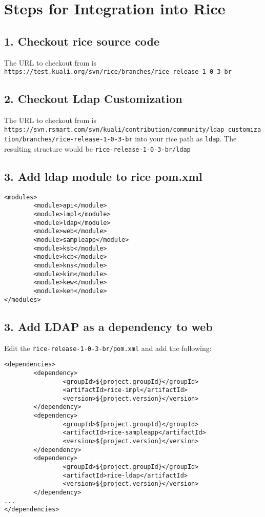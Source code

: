 \documentclass[12pt,notitlepage]{article}
\begin{document}
\section{Steps for Integration into Rice}
\subsection*{1. Checkout rice source code}
The URL to checkout from is \verb|https://test.kuali.org/svn/rice/branches/rice-release-1-0-3-br|

\subsection*{2. Checkout Ldap Customization}
The URL to checkout from is \verb|https://svn.rsmart.com/svn/kuali/contribution/community/ldap_customization/branches/rice-release-1-0-3-br| into
your rice path as \verb|ldap|. The resulting structure would be \verb|rice-release-1-0-3-br/ldap|

\subsection*{3. Add ldap module to rice pom.xml}
\begin{lstlisting}
<modules>
        <module>api</module>
        <module>impl</module>
        <module>ldap</module>
        <module>web</module>
        <module>sampleapp</module>
        <module>ksb</module>
        <module>kcb</module>
        <module>kns</module>
        <module>kim</module>
        <module>kew</module>
        <module>ken</module>
</modules>
\end{lstlisting}

\subsection*{3. Add LDAP as a dependency to web}
Edit the \verb|rice-release-1-0-3-br/pom.xml| and add the following:
\begin{lstlisting}
<dependencies>
        <dependency>
                <groupId>${project.groupId}</groupId>
                <artifactId>rice-impl</artifactId>
                <version>${project.version}</version>
        </dependency>
        <dependency>
                <groupId>${project.groupId}</groupId>
                <artifactId>rice-sampleapp</artifactId>
                <version>${project.version}</version>
        </dependency>
        <dependency>
                <groupId>${project.groupId}</groupId>
                <artifactId>rice-ldap</artifactId>
                <version>${project.version}</version>
        </dependency>
...
</dependencies>
\end{lstlisting}
\end{document}
